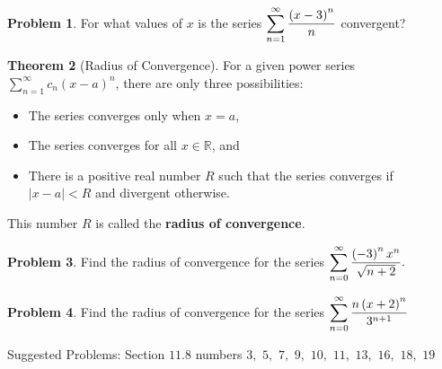 \documentclass[letterpaper, twoside, 12pt]{book}
\theoremstyle{definition}
\newtheorem{theorem}{Theorem}
\newtheorem{recall}[theorem]{Recall}
\theoremstyle{definition}
\newtheorem{problem}[theorem]{Problem}
\newcommand{\ds}{\ensuremath{\displaystyle}}
\begin{document}
\vfill

\begin{problem}
 For what values of $x$ is the series $\ds \sum_{n=1}^{\infty} \frac{\left(x-3\right)^n}{n}$ convergent?
\end{problem}

\vfill

\newpage

\begin{theorem}[Radius of Convergence]
 For a given power series $\sum_{n=1}^{\infty} c_n\left(x-a\right)^n$, there are only three possibilities:
 \begin{itemize}
  \item The series converges only when $x=a$,
  \item The series converges for all $x \in \mathbb{R}$, and
  \item There is a positive real number $R$ such that the series converges if $\left|x-a\right| < R$ and divergent otherwise.
 \end{itemize}
 This number $R$ is called the \textbf{radius of convergence}.
\end{theorem}

\begin{problem}
 Find the radius of convergence for the series $\ds \sum_{n=0}^{\infty} \frac{\left(-3\right)^n x^n}{\sqrt{n+2}}.$
\end{problem}

\vfill

\begin{problem}
 Find the radius of convergence for the series $\ds \sum_{n=0}^{\infty} \frac{n\left(x+2\right)^n}{3^{n+1}}$
\end{problem}

\vfill

\noindent Suggested Problems: Section $11.8$ numbers $3,$ $5,$ $7,$ $9,$ $10,$ $11,$ $13,$ $16,$ $18,$ $19$



\end{document}
